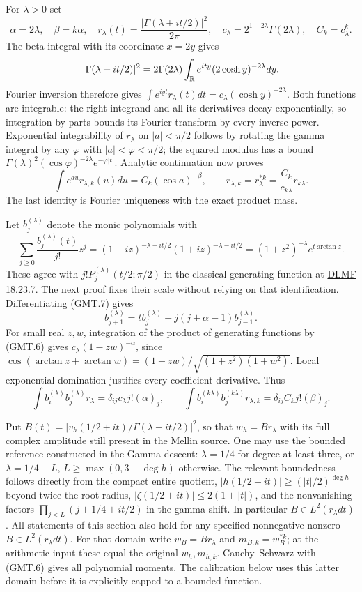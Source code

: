 For $\lambda>0$ set
\[
 \alpha=2\lambda,\quad \beta=k\alpha,\quad
 r_\lambda(t)=\frac{|\Gamma(\lambda+it/2)|^2}{2\pi},\quad
 c_\lambda=2^{1-2\lambda}\Gamma(2\lambda),\quad C_k=c_\lambda^k.
                                                                    \tag{GMT.5}
\]
The beta integral with its coordinate $x=2y$ gives
\[
 |\Gamma(\lambda+it/2)|^2
 =2\Gamma(2\lambda)\int_\mathbb R e^{ity}(2\cosh y)^{-2\lambda}dy.
\]
Fourier inversion therefore gives
$\int e^{iyt}r_\lambda(t)dt=c_\lambda(\cosh y)^{-2\lambda}$.
Both functions are integrable: the right integrand and all its
derivatives decay exponentially, so integration by parts bounds its
Fourier transform by every inverse power. Exponential integrability
of $r_\lambda$ on $|a|<\pi/2$ follows by rotating the gamma integral
by any $\varphi$ with $|a|<\varphi<\pi/2$; the squared modulus
has a bound $\Gamma(\lambda)^2(\cos\varphi)^{-2\lambda}
e^{-\varphi|t|}$. Analytic continuation now proves
\[
 \int e^{a u}r_{\lambda,k}(u)du=C_k(\cos a)^{-\beta},\qquad
 r_{\lambda,k}=r_\lambda^{*k}
             =\frac{C_k}{c_{k\lambda}}r_{k\lambda}.             \tag{GMT.6}
\]
The last identity is Fourier uniqueness with the exact product mass.

Let $b_j^{(\lambda)}$ denote the monic polynomials with
\[
 \sum_{j\ge0}\frac{b_j^{(\lambda)}(t)}{j!}z^j
 =(1-iz)^{-\lambda+it/2}(1+iz)^{-\lambda-it/2}
 =(1+z^2)^{-\lambda}e^{t\arctan z}.                             \tag{GMT.7}
\]
These agree with $j!P_j^{(\lambda)}(t/2;\pi/2)$ in the classical
generating function at
\href{https://dlmf.nist.gov/18.23.E7}{DLMF 18.23.7}.
The next proof fixes their scale without relying on that identification.
Differentiating (GMT.7) gives
\[
 b_{j+1}^{(\lambda)}=t b_j^{(\lambda)}
              -j(j+\alpha-1)b_{j-1}^{(\lambda)}.
\]
For small real $z,w$, integration of the product of generating
functions by (GMT.6) gives $c_\lambda(1-zw)^{-\alpha}$, since
$\cos(\arctan z+\arctan w)=(1-zw)/
\sqrt{(1+z^2)(1+w^2)}$. Local exponential domination justifies
every coefficient derivative. Thus
\[
 \int b_i^{(\lambda)}b_j^{(\lambda)}r_\lambda
 =\delta_{ij}c_\lambda j!(\alpha)_j,
 \qquad
 \int b_i^{(k\lambda)}b_j^{(k\lambda)}r_{\lambda,k}
 =\delta_{ij}C_kj!(\beta)_j.                                   \tag{GMT.8}
\]

Put $B(t)=|v_h(1/2+it)/\Gamma(\lambda+it/2)|^2$, so that
$w_h=B r_\lambda$ with its full complex amplitude still present
in the Mellin source. One may use the bounded reference constructed
in the Gamma descent: $\lambda=1/4$ for degree at least three,
or $\lambda=1/4+L$, $L\ge\max(0,3-\deg h)$ otherwise.
The relevant boundedness follows directly from the compact entire
quotient, $|h(1/2+it)|\ge(|t|/2)^{\deg h}$ beyond twice the root
radius, $|\zeta(1/2+it)|\le2(1+|t|)$, and the nonvanishing factors
$\prod_{j<L}(j+1/4+it/2)$ in the gamma shift. In particular
$B\in L^2(r_\lambda dt)$. All statements of this section also hold
for any specified nonnegative nonzero $B\in L^2(r_\lambda dt)$.
For that domain write $w_B=B r_\lambda$ and $m_{B,k}=w_B^{*k}$;
at the arithmetic input these equal the original $w_h,m_{h,k}$.
Cauchy--Schwarz with (GMT.6) gives all polynomial moments.
The calibration below uses this latter domain before it is explicitly
capped to a bounded function.

